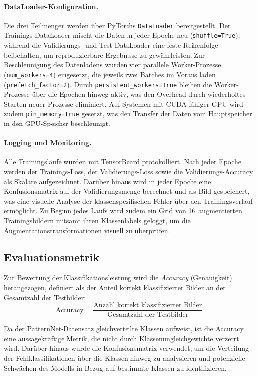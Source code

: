\paragraph{DataLoader-Konfiguration.}
Die drei Teilmengen werden über PyTorchs \texttt{DataLoader} bereitgestellt.
Der Trainings-DataLoader mischt die Daten in jeder Epoche neu (\texttt{shuffle=True}), während die Validierungs- und Test-DataLoader eine feste Reihenfolge beibehalten, um reproduzierbare Ergebnisse zu gewährleisten.
Zur Beschleunigung des Datenladens wurden vier parallele Worker-Prozesse (\texttt{num\_workers=4}) eingesetzt, die jeweils zwei Batches im Voraus laden (\texttt{prefetch\_factor=2}).
Durch \texttt{persistent\_workers=True} bleiben die Worker-Prozesse über die Epochen hinweg aktiv, was den Overhead durch wiederholtes Starten neuer Prozesse eliminiert.
Auf Systemen mit CUDA-fähiger GPU wird zudem \texttt{pin\_memory=True} gesetzt, was den Transfer der Daten vom Hauptspeicher in den GPU-Speicher beschleunigt.
 
\paragraph{Logging und Monitoring.}
Alle Trainingsläufe wurden mit TensorBoard protokolliert.
Nach jeder Epoche werden der Trainings-Loss, der Validierungs-Loss sowie die Validierungs-Accuracy als Skalare aufgezeichnet.
Darüber hinaus wird in jeder Epoche eine Konfusionsmatrix auf der Validierungsmenge berechnet und als Bild gespeichert, was eine visuelle Analyse der klassenspezifischen Fehler über den Trainingsverlauf ermöglicht.
Zu Beginn jedes Laufs wird zudem ein Grid von 16~augmentierten Trainingsbildern mitsamt ihren Klassenlabels geloggt, um die Augmentationstransformationen visuell zu überprüfen.

\subsection{Evaluationsmetrik}
\label{subsec:evaluation}

Zur Bewertung der Klassifikationsleistung wird die \textit{Accuracy} (Genauigkeit) herangezogen, definiert als der Anteil korrekt klassifizierter Bilder an der Gesamtzahl der Testbilder:
\begin{equation}
    \text{Accuracy} = \frac{\text{Anzahl korrekt klassifizierter Bilder}}{\text{Gesamtzahl der Testbilder}}
\end{equation}

Da der PatternNet-Datensatz gleichverteilte Klassen aufweist, ist die Accuracy eine aussagekräftige Metrik, die nicht durch Klassenungleichgewichte verzerrt wird.
Darüber hinaus wurde die Konfusionsmatrix verwendet, um die Verteilung der Fehlklassifikationen über die Klassen hinweg zu analysieren und potenzielle Schwächen des Modells in Bezug auf bestimmte Klassen zu identifizieren.